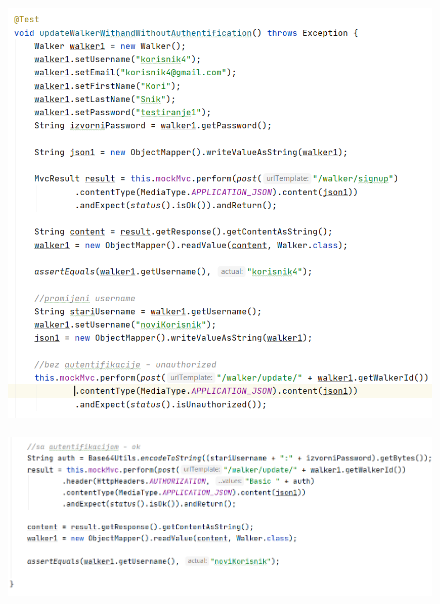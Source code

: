  		
 			\begin{figure}[H]
 				\hspace*{-0.6in}
 					\includegraphics[scale=0.75]{slike/walker3.1.PNG} %
 				\centering
 			\end{figure}
 			\begin{figure}[H]
 				\hspace*{-0.6in}
 				\includegraphics[scale=0.75]{slike/walker3.2.PNG} %
 				\centering
 			\end{figure}
 			
